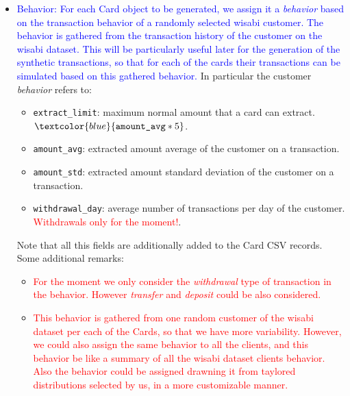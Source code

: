 \documentclass{article}
\begin{document}
\begin{itemize}
\begin{enumerate}
\end{enumerate}

    \item \textcolor{blue}{Behavior: For each Card object to be generated, we assign it a 
    \textit{behavior} based on the transaction behavior of a randomly selected wisabi 
    customer. The behavior is gathered from the transaction history of the customer on 
    the wisabi dataset. This will be particularly useful later for the generation of the 
    synthetic transactions, so that for each of the cards their transactions can be 
    simulated based on this gathered behavior.}
    In particular the customer \textit{behavior} refers to: 
    \begin{itemize}
        \item \texttt{extract\_limit}: maximum normal amount that a card can extract. 
        $\textcolor{blue}{\texttt{amount\_avg} * 5}$.
        \item \texttt{amount\_avg}: extracted amount average of the customer on a transaction.
        \item \texttt{amount\_std}: extracted amount standard deviation of the customer 
        on a transaction.
        \item \texttt{withdrawal\_day}: average number of transactions per day of the 
        customer. \textcolor{red}{Withdrawals only for the moment!}.
    \end{itemize}
    Note that all this fields are additionally added to the Card CSV records.
    Some additional remarks:
    \begin{itemize}
        \item \textcolor{red}{For the moment we only consider the \textit{withdrawal} type of transaction in the behavior. However \textit{transfer} and \textit{deposit} could be also considered.}
        \item \textcolor{red}{This behavior is gathered from one random customer of the wisabi dataset per each of the Cards, so that we have more variability. However, we could also assign the same behavior to all the clients, and this behavior be like a summary of all the wisabi dataset clients behavior. Also the behavior could be assigned drawning it from taylored distributions selected by us, in a more customizable manner.}   
    \end{itemize}
\end{itemize}
\end{document}
